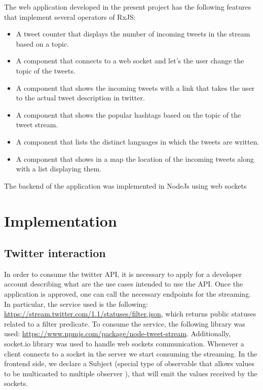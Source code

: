 \documentclass[12pt]{report}
\begin{document}
The web application developed in the present project has the following features that implement several operators of RxJS:
\begin{itemize}
\item A tweet counter that displays the number of incoming tweets in the stream based on a topic.
\item A component that connects to a web socket and let's the user change the topic of the tweets.
\item A component that shows the incoming tweets with a link that takes the user to the actual tweet description in twitter.
\item A component that shows the popular hashtags based on the topic of the tweet stream.
\item A component that lists the distinct languages in which the tweets are written.
\item A component that shows in a map the location of the incoming tweets along with a list displaying them.
\end{itemize}
The backend of the application was implemented in NodeJs using web sockets
\section{Implementation}
\subsection{Twitter interaction}
In order to consume the twitter API, it is necessary to apply for a developer account describing what are the use cases intended to use the API. Once the application is approved, one can call the necessary endpoints for the streaming. In particular, the service used is the following:
\href{https://stream.twitter.com/1.1/statuses/filter.json}{https://stream.twitter.com/1.1/statuses/filter.json}, which returns public statuses related to a filter predicate. To consume the service, the following library was used: 
\href{https://www.npmjs.com/package/node-tweet-stream}{https://www.npmjs.com/package/node-tweet-stream}. Additionally, socket.io library was used to handle web sockets communication. Whenever a client connects to a socket in the server we start consuming the streaming. In the frontend side, we declare a Subject (special type of observable that allows values to be multicasted to multiple observer \cite{rxjs}), that will emit the values received by the sockets. 
\end{document}
